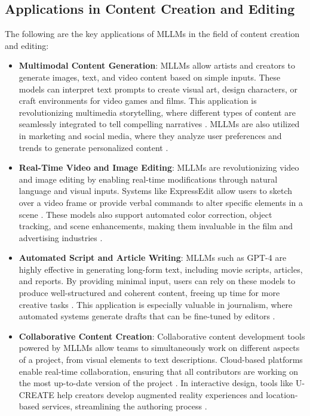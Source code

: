 \subsection{Applications in Content Creation and Editing}

The following are the key applications of MLLMs in the field of content creation and editing:

\begin{itemize}

\item \textbf{Multimodal Content Generation}: MLLMs allow artists and creators to generate images, text, and video content based on simple inputs. These models can interpret text prompts to create visual art, design characters, or craft environments for video games and films. This application is revolutionizing multimedia storytelling, where different types of content are seamlessly integrated to tell compelling narratives \cite{vs2024chang,vs2024schmidt}. MLLMs are also utilized in marketing and social media, where they analyze user preferences and trends to generate personalized content \cite{vs2020parde}.

\item \textbf{Real-Time Video and Image Editing}: MLLMs are revolutionizing video and image editing by enabling real-time modifications through natural language and visual inputs. Systems like ExpressEdit allow users to sketch over a video frame or provide verbal commands to alter specific elements in a scene \cite{vs2024tilekbay}. These models also support automated color correction, object tracking, and scene enhancements, making them invaluable in the film and advertising industries \cite{vs2024kubicek}.

\item \textbf{Automated Script and Article Writing}: MLLMs such as GPT-4 are highly effective in generating long-form text, including movie scripts, articles, and reports. By providing minimal input, users can rely on these models to produce well-structured and coherent content, freeing up time for more creative tasks \cite{vs2024eleftheriadis}. This application is especially valuable in journalism, where automated systems generate drafts that can be fine-tuned by editors \cite{vs2024anderson}.

\item \textbf{Collaborative Content Creation}: Collaborative content development tools powered by MLLMs allow teams to simultaneously work on different aspects of a project, from visual elements to text descriptions. Cloud-based platforms enable real-time collaboration, ensuring that all contributors are working on the most up-to-date version of the project \cite{vs2024santos}. In interactive design, tools like U-CREATE help creators develop augmented reality experiences and location-based services, streamlining the authoring process \cite{vs2024sauer}.


\end{itemize}
